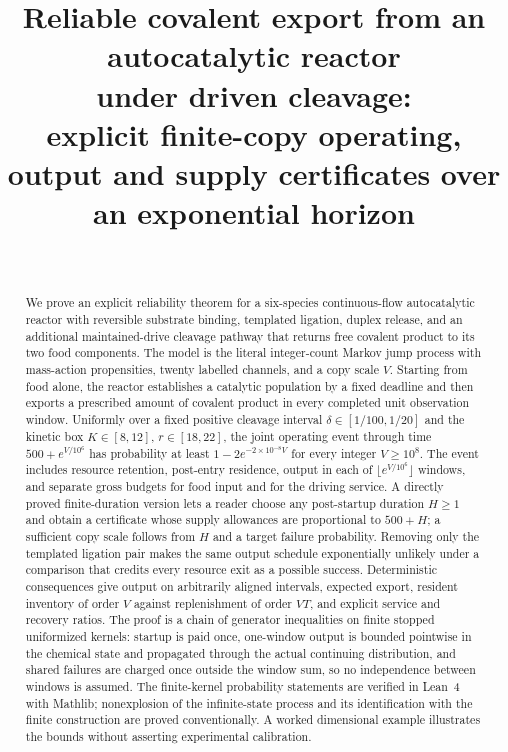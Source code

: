\documentclass[11pt,a4paper]{article}
\title{Reliable covalent export from an autocatalytic reactor\\ under driven cleavage:\\[4pt]
\large explicit finite-copy operating, output and supply certificates over an exponential horizon}
\author{\PaperAuthor\\ \small \PaperAffiliation}
\date{\PaperDate}
\theoremstyle{plain}
\theoremstyle{definition}
\theoremstyle{remark}
\begin{document}
\maketitle

\begin{abstract}
We prove an explicit reliability theorem for a six-species continuous-flow autocatalytic reactor with reversible substrate binding, templated ligation, duplex release, and an additional maintained-drive cleavage pathway that returns free covalent product to its two food components. The model is the literal integer-count Markov jump process with mass-action propensities, twenty labelled channels, and a copy scale $V$. Starting from food alone, the reactor establishes a catalytic population by a fixed deadline and then exports a prescribed amount of covalent product in every completed unit observation window. Uniformly over a fixed positive cleavage interval $\delta\in[1/100,1/20]$ and the kinetic box $K\in[8,12]$, $r\in[18,22]$, the joint operating event through time $500+e^{V/10^6}$ has probability at least $1-2e^{-2\times10^{-8}V}$ for every integer $V\ge10^8$. The event includes resource retention, post-entry residence, output in each of $\lfloor e^{V/10^6}\rfloor$ windows, and separate gross budgets for food input and for the driving service. A directly proved finite-duration version lets a reader choose any post-startup duration $H\ge1$ and obtain a certificate whose supply allowances are proportional to $500+H$; a sufficient copy scale follows from $H$ and a target failure probability. Removing only the templated ligation pair makes the same output schedule exponentially unlikely under a comparison that credits every resource exit as a possible success. Deterministic consequences give output on arbitrarily aligned intervals, expected export, resident inventory of order $V$ against replenishment of order $VT$, and explicit service and recovery ratios. The proof is a chain of generator inequalities on finite stopped uniformized kernels: startup is paid once, one-window output is bounded pointwise in the chemical state and propagated through the actual continuing distribution, and shared failures are charged once outside the window sum, so no independence between windows is assumed. The finite-kernel probability statements are verified in Lean~4 with Mathlib; nonexplosion of the infinite-state process and its identification with the finite construction are proved conventionally. A worked dimensional example illustrates the bounds without asserting experimental calibration.
\end{abstract}
\end{document}
